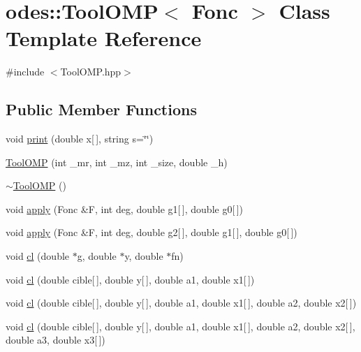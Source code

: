 \hypertarget{classodes_1_1ToolOMP}{\section{odes\-:\-:Tool\-O\-M\-P$<$ Fonc $>$ Class Template Reference}
\label{classodes_1_1ToolOMP}
}


{\ttfamily \#include $<$Tool\-O\-M\-P.\-hpp$>$}

\subsection*{Public Member Functions}
\begin{DoxyCompactItemize}
\item 
void \hyperlink{classodes_1_1ToolOMP_a5e18e949da102db38a3458e3bcc77a8f}{print} (double x\mbox{[}$\,$\mbox{]}, string s=\char`\"{}\char`\"{})
\item 
\hyperlink{classodes_1_1ToolOMP_aed94153feeb3d4d336b72d6a683e5c1e}{Tool\-O\-M\-P} (int \-\_\-mr, int \-\_\-mz, int \-\_\-size, double \-\_\-h)
\item 
\hyperlink{classodes_1_1ToolOMP_ab8a1bd745643b9d69a774887972eba72}{$\sim$\-Tool\-O\-M\-P} ()
\item 
void \hyperlink{classodes_1_1ToolOMP_a11ff865ca5c9a52945f09b9ae20390b1}{apply} (Fonc \&F, int deg, double g1\mbox{[}$\,$\mbox{]}, double g0\mbox{[}$\,$\mbox{]})
\item 
void \hyperlink{classodes_1_1ToolOMP_a0a811b71dcaa924b94a16233aa99f5cb}{apply} (Fonc \&F, int deg, double g2\mbox{[}$\,$\mbox{]}, double g1\mbox{[}$\,$\mbox{]}, double g0\mbox{[}$\,$\mbox{]})
\item 
void \hyperlink{classodes_1_1ToolOMP_ab7296c816c08254de59a18188e0cb7bc}{cl} (double $\ast$g, double $\ast$y, double $\ast$fn)
\item 
void \hyperlink{classodes_1_1ToolOMP_a307376a4f6eb8d576b99b9f75fa09c87}{cl} (double cible\mbox{[}$\,$\mbox{]}, double y\mbox{[}$\,$\mbox{]}, double a1, double x1\mbox{[}$\,$\mbox{]})
\item 
void \hyperlink{classodes_1_1ToolOMP_a9eb20b23529fc12231cb5539fd88d109}{cl} (double cible\mbox{[}$\,$\mbox{]}, double y\mbox{[}$\,$\mbox{]}, double a1, double x1\mbox{[}$\,$\mbox{]}, double a2, double x2\mbox{[}$\,$\mbox{]})
\item 
void \hyperlink{classodes_1_1ToolOMP_a5ec1f873ab5947e7e85f54b0d10c34e2}{cl} (double cible\mbox{[}$\,$\mbox{]}, double y\mbox{[}$\,$\mbox{]}, double a1, double x1\mbox{[}$\,$\mbox{]}, double a2, double x2\mbox{[}$\,$\mbox{]}, double a3, double x3\mbox{[}$\,$\mbox{]})

\end{DoxyCompactItemize}
